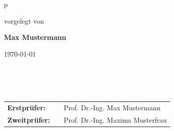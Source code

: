 \begin{center}
\begin{tabular}{p{\textwidth}}
\begin{center}
vorgelegt von
\end{center}

\begin{center}
\large{\textbf{Max Mustermann}} \\
\end{center}

\begin{center}
\large{\today}
\end{center}

\\
\\
\\

\begin{center}
\begin{tabular}{lll}
\textbf{Erstprüfer:} & & Prof. Dr.-Ing. Max Mustermann\\
\textbf{Zweitprüfer:} & & Prof. Dr.-Ing. Maxima Musterfrau\\
\end{tabular}
\end{center}

\end{tabular}
\end{center}